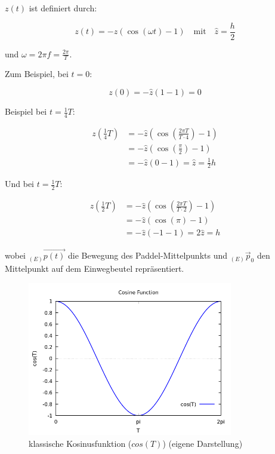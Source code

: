 \( z(t) \) ist definiert durch:

\begin{equation}
    z(t) = -\hat{z}(\cos(\omega t)-1)  \quad \text{mit} \quad \hat{z} = \frac{h}{2}
\end{equation}

und \( \omega = 2 \pi f = \frac{2 \pi}{T} \).

Zum Beispiel, bei \( t = 0 \):

\begin{equation}
    z(0) = -\hat{z}(1-1) = 0
\end{equation}

Beispiel bei \( t = \frac{1}{4}T \):

\begin{equation}
    \begin{aligned}
        z\left(\frac{1}{4}T\right) &= -\hat{z}\left(\cos\left(\frac{2\pi T}{T \cdot 4}\right) - 1\right) \\
        &= -\hat{z}\left(\cos\left(\frac{\pi}{2}\right) - 1\right) \\
        &= -\hat{z}(0 - 1) = \hat{z} = \frac{1}{2} h
    \end{aligned}
\end{equation}

Und bei \( t = \frac{1}{2}T \):

\begin{equation}
    \begin{aligned}
        z\left(\frac{1}{2}T\right) &= -\hat{z}\left(\cos\left(\frac{2\pi T}{T \cdot 2}\right) - 1\right) \\
        &= -\hat{z}\left(\cos(\pi) - 1\right) \\
        &= -\hat{z}(-1 - 1) = 2\hat{z} = h
    \end{aligned}
\end{equation}


wobei \( _{(E)}\vec{p(t)} \) die Bewegung des Paddel-Mittelpunkts und \( _{(E)}\vec{p}_{0} \) den Mittelpunkt auf dem Einwegbeutel repräsentiert.

\begin{figure}[h]
    \centering
    \includegraphics[width=0.8\textwidth]{bilder/cosine-plot.png}
    \caption[Kosinusfunktion]{klassische Kosinusfunktion (\( cos(T) \)) (eigene Darstellung)}\label{fig:Kosinusfunktion}
\end{figure}

